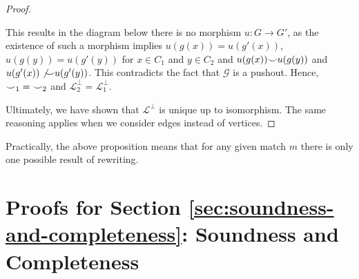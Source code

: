 \begin{proof}
\begin{itemize}
              This results in the diagram below there is no morphism $u : G \to G'$, as the existence of such a morphism implies $u(g(x)) = u(g'(x))$, $u(g(y)) = u(g'(y))$ for $x \in C_1$ and $y \in C_2$ and $u(g(x)) {\smile} u(g(y))$ and $u(g'(x)) \not {\smile} u(g'(y))$.
              This contradicts the fact that $\mathcal{G}$ is a pushout.
              Hence, ${\smile}_{1} = {\smile}_{2}$ and $\mathcal{L}_{2}^{\bot} = \mathcal{L}_{1}^{\bot}$.
    \end{itemize}
    Ultimately, we have shown that $\mathcal{L}^{\bot}$ is unique up to isomorphism.
    The same reasoning applies when we consider edges instead of vertices.
\end{proof}

Practically, the above proposition means that for any given match $m$ there is only one possible result of rewriting.




\section{Proofs for Section \ref{sec:soundness-and-completeness}: Soundness and Completeness}


